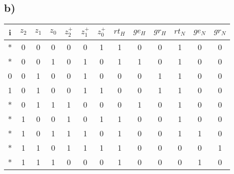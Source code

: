 \documentclass[a4paper]{scrartcl}
\begin{document}
	\subsection{b)}
		\begin{center}
			\begin{tabular}{|c| c c c || c c c | c c c | c c c |}\hline
				i & $z_2$ & $z_1$ & $z_0$ & $z_{2}^+$ & $z_{1}^+$ & $z_{0}^+$ & $rt_H$ & $ge_H$ & 
				$gr_H$ & $rt_N$ & $ge_N$ & $gr_N$ \\ \hline

				* & 0 & 0 & 0 & 0 & 0 & 1 &	1 & 0 & 0 & 1 & 0 & 0\\
				* & 0 & 0 & 1 & 0 & 1 & 0 & 1 & 1 & 0 & 1 & 0 & 0\\
				0 & 0 & 1 & 0 & 0 & 1 & 0 & 0 & 0 & 1 & 1 & 0 & 0\\
				1 & 0 & 1 & 0 & 0 & 1 & 1 & 0 & 0 & 1 & 1 & 0 & 0\\
				* & 0 & 1 & 1 & 1 & 0 & 0 & 0 & 1 & 0 & 1 & 0 & 0\\
				* & 1 & 0 & 0 & 1 & 0 & 1 & 1 & 0 & 0 & 1 & 0 & 0\\
				* & 1 & 0 & 1 & 1 & 1 & 0 & 1 & 0 & 0 & 1 & 1 & 0\\
				* & 1 & 1 & 0 & 1 & 1 & 1 & 1 & 0 & 0 & 0 & 0 & 1\\
				* & 1 & 1 & 1 & 0 & 0 & 0 & 1 & 0 & 0 & 0 & 1 & 0\\ \hline
			\end{tabular}
		\end{center}
		
\end{document}
